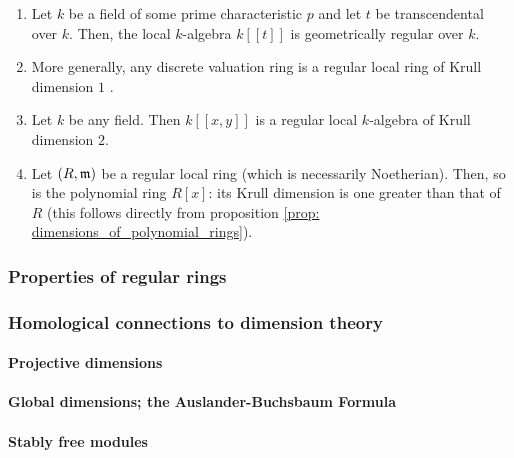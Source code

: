                 \begin{example} \label{example: regular_rings}
                    \noindent
                    \begin{enumerate}
                        \item Let $k$ be a field of some prime characteristic $p$ and let $t$ be transcendental over $k$. Then, the local $k$-algebra $k[\![t]\!]$ is geometrically regular over $k$. 
                        \item More generally, any discrete valuation ring is a regular local ring of Krull dimension $1$ \cite[\href{https://stacks.math.columbia.edu/tag/00PD}{Tag 00PD}]{stacks}.  
                        \item Let $k$ be any field. Then $k[\![x, y]\!]$ is a regular local $k$-algebra of Krull dimension $2$. 
                        \item Let $(R, \mathfrak{m})$ be a regular local ring (which is necessarily Noetherian). Then, so is the polynomial ring $R[x]$: its Krull dimension is one greater than that of $R$ (this follows directly from proposition \ref{prop: dimensions_of_polynomial_rings}).
                    \end{enumerate}
                \end{example}
                
            \subsubsection{Properties of regular rings}
            
            \subsubsection{Homological connections to dimension theory}
                \paragraph{Projective dimensions}
                
                \paragraph{Global dimensions; the Auslander-Buchsbaum Formula}
                
                \paragraph{Stably free modules}
    
